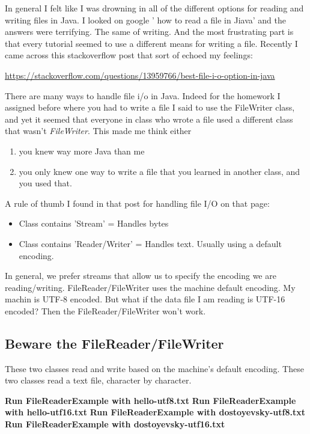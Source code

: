 \documentclass[12pt]{article}
\begin{document}
In general I felt like I was drowning in all of the different options for reading and writing files in Java. I looked on google ' how to read a file in Jiava' and the answers were terrifying. The same of writing. And the most frustrating part is that every tutorial seemed to use a different means for writing a file. Recently I came across this stackoverflow post that sort of echoed my feelings:

\url{https://stackoverflow.com/questions/13959766/best-file-i-o-option-in-java}

There are many ways to handle file i/o in Java. Indeed for the homework I assigned before where you had to write a file I said to use the FileWriter class, and yet it seemed that everyone in class who wrote a file used a different class that wasn't \textit{FileWriter}. This made me think either 

\begin{enumerate}
\item you knew way more Java than me
\item you only knew one way to write a file that you learned in another class, and you used that.
\end{enumerate}

 A rule of thumb I found in that post for handling file I/O on that page:
\begin{itemize}
\item Class contains 'Stream' = Handles bytes
\item Class contains 'Reader/Writer' = Handles text. Usually using a default encoding.
\end{itemize}

In general, we prefer streams that allow us to specify the encoding we are reading/writing. FileReader/FileWriter uses the machine default encoding. My machin is UTF-8 encoded. But what if the data file I am reading is UTF-16 encoded? Then the FileReader/FileWriter won't work.

\subsection{Beware the FileReader/FileWriter}
These two classes read and write based on the machine's default encoding. These two classes read a text file, character by character.

\begin{center}
\textbf{Run FileReaderExample with hello-utf8.txt}
\textbf{Run FileReaderExample with hello-utf16.txt}
\textbf{Run FileReaderExample with dostoyevsky-utf8.txt}
\textbf{Run FileReaderExample with dostoyevsky-utf16.txt}
\end{center}
\end{document}
